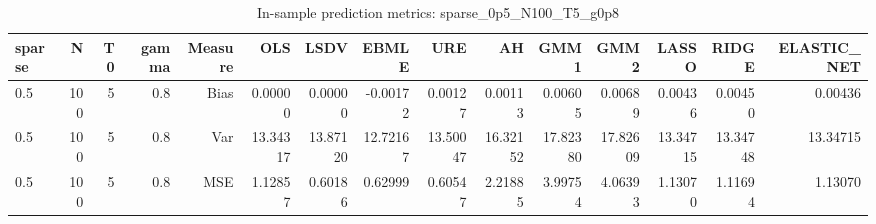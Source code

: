 \begin{table}[!htbp]\centering
\caption{In-sample prediction metrics: sparse_0p5_N100_T5_g0p8}
\label{tab:table2_sparse_0p5_N100_T5_g0p8}
\begin{tabular}{lrrrrrrrrrrrrrr}
\hline
sparse & N & T0 & gamma & Measure & OLS & LSDV & EBMLE & URE & AH & GMM1 & GMM2 & LASSO & RIDGE & ELASTIC_NET \\
\hline
0.5 & 100 & 5 & 0.8 & Bias & 0.00000 & 0.00000 & -0.00172 & 0.00127 & 0.00113 & 0.00605 & 0.00689 & 0.00436 & 0.00450 & 0.00436 \\
0.5 & 100 & 5 & 0.8 & Var & 13.34317 & 13.87120 & 12.72167 & 13.50047 & 16.32152 & 17.82380 & 17.82609 & 13.34715 & 13.34748 & 13.34715 \\
0.5 & 100 & 5 & 0.8 & MSE & 1.12857 & 0.60186 & 0.62999 & 0.60547 & 2.21885 & 3.99754 & 4.06393 & 1.13070 & 1.11694 & 1.13070 \\
\hline
\end{tabular}
\end{table}

